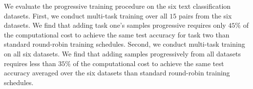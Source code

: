 We evaluate the progressive training procedure on the six text classification datasets.
First, we conduct multi-task training over all $15$ pairs from the six datasets.
We find that adding task one's samples progressive requires only $45\%$ of the computational cost to achieve the same test accuracy for task two than standard round-robin training schedules.
Second, we conduct multi-task training on all six datasets.
We find that adding samples progressively from all datasets requires less than $35\%$ of the computational cost to achieve the same test accuracy averaged over the six datasets than standard round-robin training schedules.


